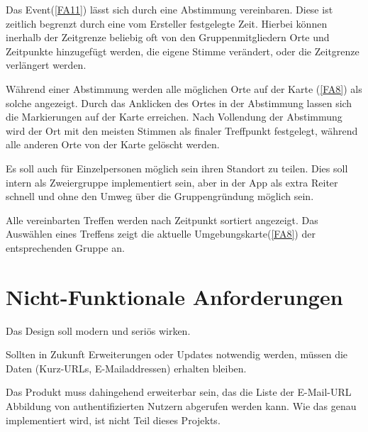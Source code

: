\documentclass[parskip=full,11pt,twoside]{scrartcl}
\begin{document}
\label{FA12}
Das Event(\ref{FA11}) lässt sich durch eine Abstimmung vereinbaren. Diese ist zeitlich begrenzt durch eine vom Ersteller festgelegte Zeit. Hierbei können inerhalb der Zeitgrenze beliebig oft von den Gruppenmitgliedern Orte und Zeitpunkte hinzugefügt werden, die eigene Stimme verändert, oder die Zeitgrenze verlängert werden.

\label{FA13}
Während einer Abstimmung werden alle möglichen Orte auf der Karte (\ref{FA8}) als solche angezeigt. Durch das Anklicken des Ortes in der Abstimmung lassen sich die Markierungen auf der Karte erreichen. Nach Vollendung der Abstimmung wird der Ort mit den meisten Stimmen als finaler Treffpunkt festgelegt, während alle anderen Orte von der Karte gelöscht werden.

\label{FA14}
Es soll auch für Einzelpersonen möglich sein ihren Standort zu teilen. Dies soll intern als Zweiergruppe implementiert sein, aber in der App als extra Reiter schnell und ohne den Umweg über die Gruppengründung möglich sein.

\label{FA15}
Alle vereinbarten Treffen werden nach Zeitpunkt sortiert angezeigt. Das Auswählen eines Treffens zeigt die aktuelle Umgebungskarte(\ref{FA8}) der entsprechenden Gruppe an.

\section{Nicht-Funktionale Anforderungen}


Das Design soll modern und seriös wirken.


Sollten in Zukunft Erweiterungen oder Updates notwendig werden,
müssen die Daten (Kurz-URLs, E-Mailaddressen) erhalten bleiben.


Das Produkt muss dahingehend erweiterbar sein,
das die Liste der E-Mail-URL Abbildung von authentifizierten Nutzern
abgerufen werden kann.
Wie das genau implementiert wird, ist nicht Teil dieses Projekts.
\end{document}
